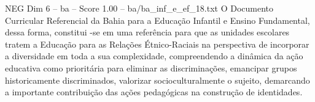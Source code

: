\begin{textsample}{NEG Dim 6 – ba – Score 1.00 – ba/ba\_inf\_e\_ef\_18.txt}
O Documento Curricular Referencial da Bahia para a Educação Infantil e Ensino Fundamental, dessa forma, constitui -se em uma referência para que as unidades escolares tratem a Educação para as Relações Étnico-Raciais na perspectiva de incorporar a diversidade em toda a sua complexidade, compreendendo a dinâmica da ação educativa como prioritária para eliminar as discriminações, emancipar grupos historicamente discriminados, valorizar socioculturalmente o sujeito, demarcando a importante contribuição das ações pedagógicas na construção de identidades.

\end{textsample}
